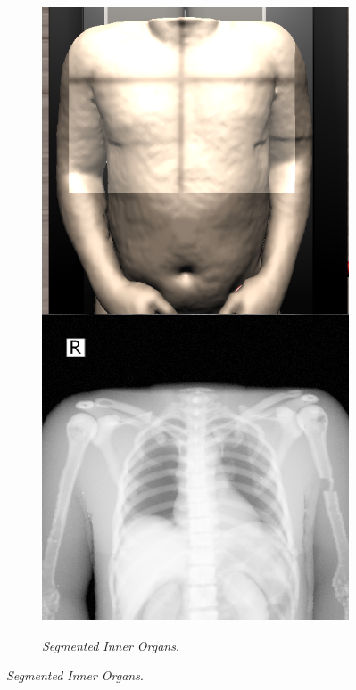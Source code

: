 \begin{figure}[h]
\begin{subfigure}[b]{0.24\linewidth}
    \end{subfigure}
    \begin{subfigure}[b]{0.24\linewidth}
        \centering
        {\includegraphics[width=\linewidth]{IMG/HVPex.png}}
        \caption{\emph{Segmented Inner Organs}\label{subfig:HVP}.}

\end{subfigure}
\end{figure}
